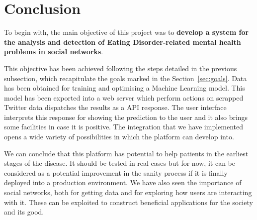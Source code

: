\section{Conclusion}
\label{sec:conclusion}

To begin with, the main objective of this project was to \textbf{develop a system for the analysis and detection of Eating Disorder-related mental health problems in social networks}.

This objective has been achieved following the steps detailed in the previous subsection, which recapitulate the goals marked in the Section~\ref{sec:goals}. Data has been obtained for training and optimising a Machine Learning model. This model has been exported into a web server which perform actions on scrapped Twitter data dispatches the results as a API response. The user interface interprets this response for showing the prediction to the user and it also brings some facilities in case it is positive. The integration that we have implemented opens a wide variety of possibilities in which the platform can develop into. 

We can conclude that this platform has potential to help patients in the earliest stages of the disease. It should be tested in real cases but for now, it can be considered as a potential improvement in the sanity process if it is finally deployed into a production environment. We have also seen the importance of social networks, both for getting data and for exploring how users are interacting with it. These can be exploited to construct beneficial applications for the society and its good.


